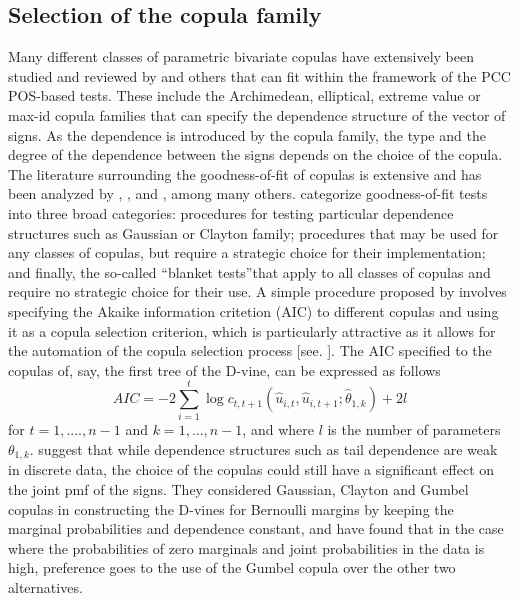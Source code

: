\documentclass[harvard,11pt]{article}
\begin{document}
\subsection{Selection of the copula family \label{Selection of the copula family}}
Many different classes of parametric bivariate copulas have extensively been studied and reviewed by \citet{joe2014dependence} and others that can fit within the framework of the PCC POS-based tests. These include the Archimedean, elliptical, extreme value or max-id copula families that can specify the dependence structure of the vector of signs. As the dependence is introduced by the copula family, the type and the degree of the dependence between the signs depends on the choice of the copula. The literature surrounding the goodness-of-fit of copulas is extensive and has been analyzed by \citet{genest2006goodness}, \citet{genest2009goodness}, and \citet{berg2009copula}, among many others. \citet{genest2009goodness} categorize goodness-of-fit tests into three broad categories: procedures for testing particular dependence structures such as Gaussian or Clayton family; procedures that may be used for any classes of copulas, but require a strategic choice for their implementation; and finally, the so-called \textquotedblleft blanket tests\textquotedblright that apply to all classes of copulas and require no strategic choice for their use. A simple procedure proposed by \citet{joe1997multivariate} involves specifying the Akaike information critetion (AIC) to different copulas and using it as a copula selection criterion, which is particularly attractive as it allows for the automation of the copula selection process [see. \citet{czado2012maximum}]. The AIC specified to the copulas of, say, the first tree of the D-vine, can be expressed as follows
\[
AIC=-2\sum\limits_{i=1}^{t}\log c_{t,t+1}(\hat{u}_{i,t},\hat{u}_{i,t+1};\hat{\theta}_{1,k})+2l
\] 
for $t=1,....,n-1$ and $k=1,...,n-1$, and where $l$ is the number of parameters $\theta_{1,k}$. \citet{panagiotelis2012pair} suggest that while dependence structures such as tail dependence are weak in discrete data, the choice of the copulas could still have a significant effect on the joint pmf of the signs. They considered Gaussian, Clayton and Gumbel copulas in constructing the D-vines for Bernoulli margins by keeping the marginal probabilities and dependence constant, and have found that in the case where the probabilities of zero marginals and joint probabilities in the data is high, preference goes to the use of the Gumbel copula over the other two alternatives. 
\end{document}
